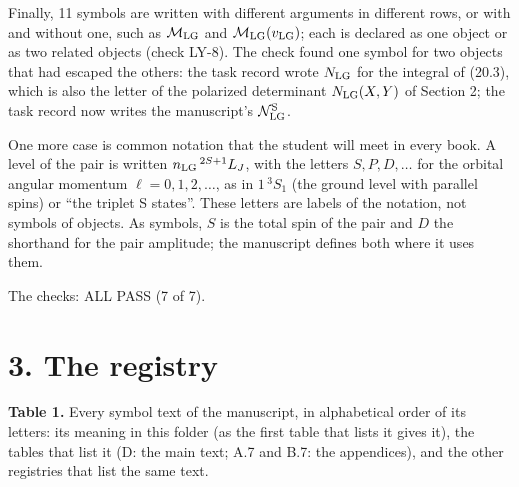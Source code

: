 \documentclass[
  10pt,
]{article}
\begin{document}
Finally, 11 symbols are written with different arguments in different
rows, or with and without one, such as \(\mathcal M_{\rm LG}\) and
\(\mathcal M_{\rm LG}(v_{\rm LG})\); each is declared as one object or
as two related objects (check LY-8). The check found one symbol for two
objects that had escaped the others: the task record wrote
\(N_{\rm LG}\) for the integral of (20.3), which is also the letter of
the polarized determinant \(N_{\rm LG}(X,Y)\) of Section 2; the task
record now writes the manuscript's \(\mathcal N^{\rm S}_{\rm LG}\).

One more case is common notation that the student will meet in every
book. A level of the pair is written \(n_{\rm LG}\,{}^{2S+1}L_J\), with
the letters \(S,P,D,\dots\) for the orbital angular momentum
\(\ell=0,1,2,\dots\), as in \(1\,{}^3S_1\) (the ground level with
parallel spins) or ``the triplet S states''. These letters are labels of
the notation, not symbols of objects. As symbols, \(S\) is the total
spin of the pair and \(D\) the shorthand for the pair amplitude; the
manuscript defines both where it uses them.

The checks: ALL PASS (7 of 7).

\hypertarget{the-registry}{%
\section{3. The registry}\label{the-registry}}

\textbf{Table 1.} Every symbol text of the manuscript, in alphabetical
order of its letters: its meaning in this folder (as the first table
that lists it gives it), the tables that list it (D: the main text; A.7
and B.7: the appendices), and the other registries that list the same
text.
\end{document}
